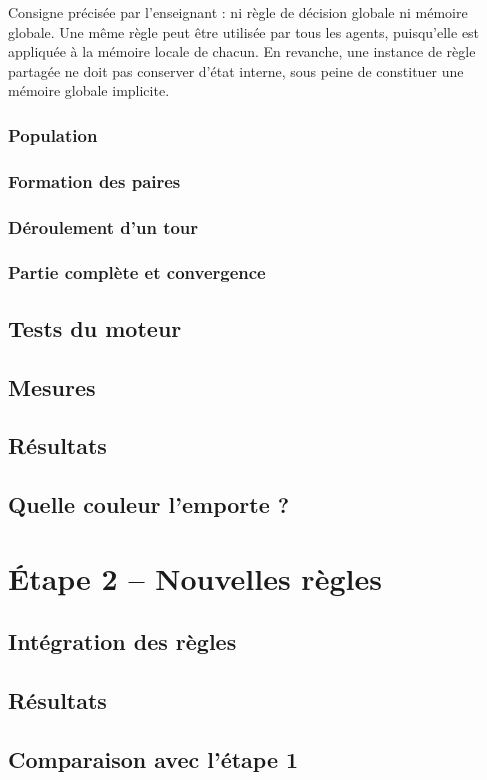 \documentclass[11pt,a4paper]{article}
\begin{document}
Consigne précisée par l'enseignant : ni règle de décision globale ni mémoire globale. Une même règle peut être utilisée par
tous les agents, puisqu'elle est appliquée à la mémoire locale de chacun. En revanche, une instance de règle partagée ne doit
pas conserver d'état interne, sous peine de constituer une mémoire globale implicite.

\subsubsection{Population}
\subsubsection{Formation des paires}
\subsubsection{Déroulement d'un tour}
\subsubsection{Partie complète et convergence}
\subsection{Tests du moteur}
\subsection{Mesures}
\subsection{Résultats}
\subsection{Quelle couleur l'emporte ?}

\section{Étape 2 -- Nouvelles règles}
\subsection{Intégration des règles}
\subsection{Résultats}
\subsection{Comparaison avec l'étape 1}
\end{document}
